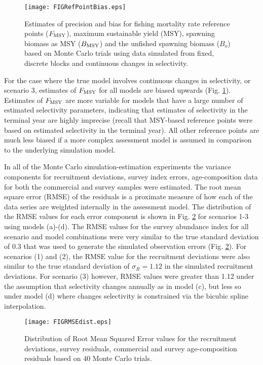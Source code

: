 \documentclass[review,letterpaper,10pt,authoryear]{elsarticle}
\begin{document}
\begin{figure*}[!tbh]
	\begin{center}
		\texttt{[image: FIGRefPointBias.eps]}
	\end{center}
	\caption{Estimates of precision and bias for fishing mortality rate reference points ($F_{\rm{MSY}}$), maximum sustainable yield (MSY), spawning biomass as MSY ($B_{\rm{MSY}}$) and the unfished spawning biomass ($B_o$) based on Monte Carlo trials using data simulated from fixed, discrete blocks and continuous changes in selectivity. }
	\label{fig:RefPointBias}
\end{figure*}

For the case where the true model involves continuous changes in selectivity, or scenario 3, estimates of $F_{\rm{MSY}}$ for all models are biased upwards (Fig. \ref{fig:RefPointBias}).  Estimates of $F_{\rm{MSY}}$ are more variable for models that have a large number of estimated selectivity parameters, indicating that estimates of selectivity in the terminal year are highly imprecise (recall that MSY-based reference points were based on estimated selectivity in the terminal year). All other reference points are much less biased if a more complex assessment model is assumed in comparison to the underlying simulation model.


In all of the Monte Carlo simulation-estimation experiments the variance components for recruitment deviations, survey index errors, age-composition data for both the commercial and survey samples were estimated.  The root mean square error (RMSE) of the residuals is a proximate measure of how each of the data series are weighted internally in the assessment model.   The distribution of the RMSE values for each error component is shown in Fig. \ref{fig:RMSEdist} for scenarios 1-3 using models (a)-(d).  The RMSE values for the survey abundance index for all scenario and model combinations were very similar to the true standard deviation of 0.3 that was used to generate the simulated observation errors (Fig. \ref{fig:RMSEdist}).   For scenarios (1) and (2), the RMSE value for the recruitment deviations were also similar to the true standard deviation of $\sigma_R=1.12$ in the simulated recruitment deviations.  For scenario (3) however, RMSE values were greater than 1.12 under the assumption that selectivity changes annually  as in model (c), but less so under model (d) where changes selectivity is constrained via the bicubic spline interpolation.

\begin{figure*}[!tbh]
	\begin{center}
		\texttt{[image: FIGRMSEdist.eps]}
	\end{center}
	\caption{Distribution of Root Mean Squared Error values for the recruitment deviations, survey residuals, commercial and survey age-composition residuals based on 40 Monte Carlo trials.}
	\label{fig:RMSEdist}
\end{figure*}
\end{document}
